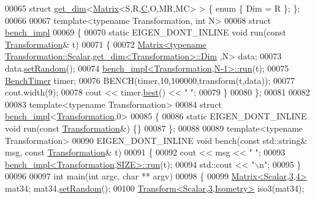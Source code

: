 \begin{DoxyCode}
00065 \textcolor{keyword}{struct }\hyperlink{structget__dim}{get\_dim}<\hyperlink{group___core___module_class_eigen_1_1_matrix}{Matrix}<S,R,\hyperlink{group___core___module}{C},O,MR,MC> > \{ \textcolor{keyword}{enum} \{ Dim = R \}; \};
00066 
00067 \textcolor{keyword}{template}<\textcolor{keyword}{typename} Transformation, \textcolor{keywordtype}{int} N>
00068 \textcolor{keyword}{struct }\hyperlink{structbench__impl}{bench\_impl}
00069 \{
00070   \textcolor{keyword}{static} EIGEN\_DONT\_INLINE \textcolor{keywordtype}{void} run(\textcolor{keyword}{const} \hyperlink{class_transformation}{Transformation}& t)
00071   \{
00072     \hyperlink{group___core___module_class_eigen_1_1_matrix}{Matrix<typename Transformation::Scalar,get\_dim<Transformation>::Dim}
      ,N> data;
00073     data.\hyperlink{class_eigen_1_1_plain_object_base_af0e576a0e1aefc9ee346de44cc352ba3}{setRandom}();
00074     \hyperlink{structbench__impl}{bench\_impl<Transformation,N-1>::run}(t);
00075     \hyperlink{class_eigen_1_1_bench_timer}{BenchTimer} timer;
00076     BENCH(timer,10,100000,transform(t,data));
00077     cout.width(9);
00078     cout << timer.\hyperlink{class_eigen_1_1_bench_timer_ae8b673b0fa356d3432c7a65c79e8af0e}{best}() << \textcolor{stringliteral}{" "};
00079   \}
00080 \};
00081 
00082 
00083 \textcolor{keyword}{template}<\textcolor{keyword}{typename} Transformation>
00084 \textcolor{keyword}{struct }\hyperlink{structbench__impl}{bench\_impl}<\hyperlink{class_transformation}{Transformation},0>
00085 \{
00086   \textcolor{keyword}{static} EIGEN\_DONT\_INLINE \textcolor{keywordtype}{void} run(\textcolor{keyword}{const} \hyperlink{class_transformation}{Transformation}&) \{\}
00087 \};
00088 
00089 \textcolor{keyword}{template}<\textcolor{keyword}{typename} Transformation>
00090 EIGEN\_DONT\_INLINE \textcolor{keywordtype}{void} bench(\textcolor{keyword}{const} std::string& msg, \textcolor{keyword}{const} \hyperlink{class_transformation}{Transformation}& t)
00091 \{
00092   cout << msg << \textcolor{stringliteral}{" "};
00093   \hyperlink{structbench__impl}{bench\_impl<Transformation,SIZE>::run}(t);
00094   std::cout << \textcolor{stringliteral}{"\(\backslash\)n"};
00095 \}
00096 
00097 \textcolor{keywordtype}{int} main(\textcolor{keywordtype}{int} argc, \textcolor{keywordtype}{char} ** argv)
00098 \{
00099   \hyperlink{group___core___module_class_eigen_1_1_matrix}{Matrix<Scalar,3,4>} mat34; mat34.\hyperlink{class_eigen_1_1_plain_object_base_af0e576a0e1aefc9ee346de44cc352ba3}{setRandom}();
00100   \hyperlink{group___geometry___module_class_eigen_1_1_transform}{Transform<Scalar,3,Isometry>} iso3(mat34);

\end{DoxyCode}
